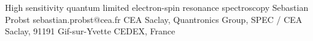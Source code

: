 \begin{conf-abstract}[]
{High sensitivity quantum limited electron-spin resonance spectroscopy}
{\color{blue} Sebastian Probst}
{sebastian.probst@cea.fr}
{CEA Saclay, Quantronics Group, SPEC / CEA Saclay, 91191 Gif-sur-Yvette CEDEX, France}
{\decofourleft \decofourright}





\printbibliography[heading=none]

\end{conf-abstract}
